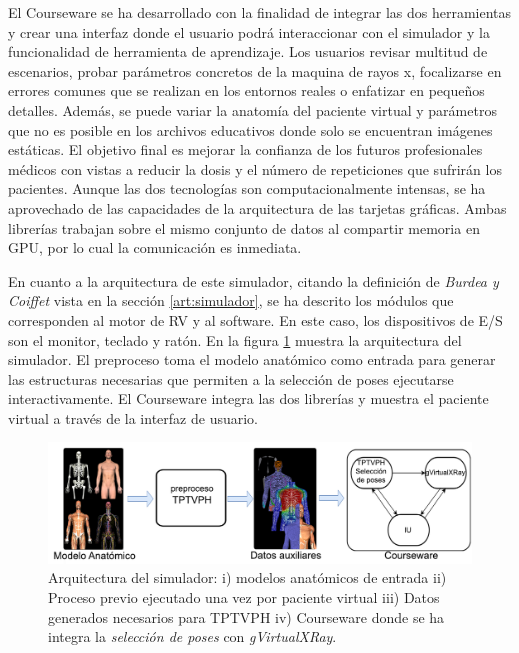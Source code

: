 El \ac{Courseware} se ha desarrollado con la finalidad de integrar las dos herramientas y crear una interfaz donde el usuario podrá interaccionar con el simulador y la funcionalidad de herramienta de aprendizaje.
Los usuarios revisar multitud de escenarios, probar parámetros concretos de la maquina de rayos x, focalizarse en errores comunes que se realizan en los entornos reales o enfatizar en pequeños detalles. Además, se puede variar la anatomía del paciente virtual y parámetros que no es posible en los archivos educativos donde solo se encuentran imágenes estáticas. El objetivo final es mejorar la confianza de los futuros profesionales médicos con vistas a reducir la dosis y el número de repeticiones que sufrirán los pacientes. Aunque las dos tecnologías son computacionalmente intensas, se ha aprovechado de las capacidades de la arquitectura de las tarjetas gráficas. Ambas librerías trabajan sobre el mismo conjunto de datos al compartir memoria en \acs{GPU}, por lo cual la comunicación es inmediata.

En cuanto a la arquitectura de este simulador, citando la definición de \emph{Burdea y Coiffet} vista en la sección \ref{art:simulador}, se ha descrito los módulos que corresponden al motor de \ac{RV} y al software. En este caso, los dispositivos de \ac{E/S} son el monitor, teclado y ratón. En la figura \ref{fig:Posesummary} muestra la arquitectura del simulador. El preproceso toma el modelo anatómico como entrada para generar las estructuras necesarias que permiten a la selección de poses ejecutarse interactivamente. El \ac{Courseware} integra las dos librerías y muestra el paciente virtual a través de la interfaz de usuario.

\begin{figure}[h]
\centering
\includegraphics[width=\linewidth]{IMG/ArquXRAY.pdf}

\caption{\label{fig:Posesummary} Arquitectura del simulador: i) modelos anatómicos de entrada ii) Proceso previo ejecutado una vez por paciente virtual iii) Datos generados necesarios para TPTVPH iv) \ac{Courseware} donde se ha integra la \emph{selección de poses} con \emph{gVirtualXRay}.
}
\end{figure}

